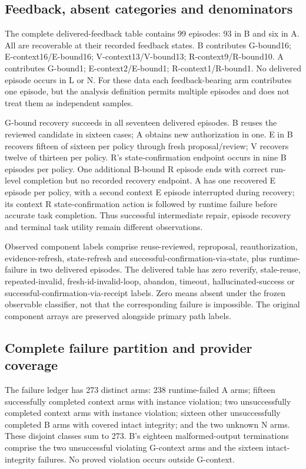 \documentclass[11pt,a4paper]{article}
\begin{document}
\subsection{Feedback, absent categories and denominators}
The complete delivered-feedback table contains 99 episodes: 93 in B and six in A. All are recoverable at their recorded feedback states. B contributes G-bound16; E-context16/E-bound16; V-context13/V-bound13; R-context9/R-bound10. A contributes G-bound1; E-context2/E-bound1; R-context1/R-bound1. No delivered episode occurs in L or N. For these data each feedback-bearing arm contributes one episode, but the analysis definition permits multiple episodes and does not treat them as independent samples.

G-bound recovery succeeds in all seventeen delivered episodes. B reuses the reviewed candidate in sixteen cases; A obtains new authorization in one. E in B recovers fifteen of sixteen per policy through fresh proposal/review; V recovers twelve of thirteen per policy. R's state-confirmation endpoint occurs in nine B episodes per policy. One additional B-bound R episode ends with correct run-level completion but no recorded recovery endpoint. A has one recovered E episode per policy, with a second context E episode interrupted during recovery; its context R state-confirmation action is followed by runtime failure before accurate task completion. Thus successful intermediate repair, episode recovery and terminal task utility remain different observations.

Observed component labels comprise reuse-reviewed, reproposal, reauthorization, evidence-refresh, state-refresh and successful-confirmation-via-state, plus runtime-failure in two delivered episodes. The delivered table has zero reverify, stale-reuse, repeated-invalid, fresh-id-invalid-loop, abandon, timeout, hallucinated-success or successful-confirmation-via-receipt labels. Zero means absent under the frozen observable classifier, not that the corresponding failure is impossible. The original component arrays are preserved alongside primary path labels.

\subsection{Complete failure partition and provider coverage}
The failure ledger has 273 distinct arms: 238 runtime-failed A arms; fifteen successfully completed context arms with instance violation; two unsuccessfully completed context arms with instance violation; sixteen other unsuccessfully completed B arms with covered intact integrity; and the two unknown N arms. These disjoint classes sum to 273. B's eighteen malformed-output terminations comprise the two unsuccessful violating G-context arms and the sixteen intact-integrity failures. No proved violation occurs outside G-context.
\end{document}
